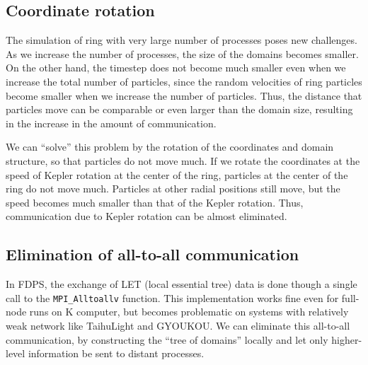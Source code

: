 \documentclass[conference]{IEEEtran}
\begin{document}
\subsection{Coordinate rotation}
\label{subsec:exptcl}

The simulation of ring with very large number of processes poses
new challenges. As we increase the number of processes, the size of
the domains becomes smaller. On the other hand, the timestep does not
become much smaller even when we increase the total number of
particles, since the random velocities of ring particles become
smaller when we increase the number of particles. Thus, the distance
that particles move can be comparable or even larger than the domain
size, resulting in the increase in the amount of  communication.

We can ``solve'' this problem by the rotation of  the coordinates and domain
structure, so that particles do not move much. If we rotate the
coordinates at the speed of Kepler rotation at the center of the ring,
particles at the center of the ring do not move much. Particles at
other radial positions still move, but the speed becomes much smaller
than that of the Kepler rotation. Thus, communication due to Kepler
rotation can be almost eliminated.


\subsection{Elimination of all-to-all communication}
\label{subsec:exlet}



In FDPS, the exchange of LET (local essential tree) data is done
though a single call to the {\tt MPI\_Alltoallv} function.  This
implementation works fine even for full-node runs on K computer, but
becomes problematic on systems with relatively weak network like
TaihuLight and GYOUKOU. We can eliminate this all-to-all communication, by
constructing the ``tree of domains'' locally and let only higher-level
information be sent to distant processes.
\end{document}
